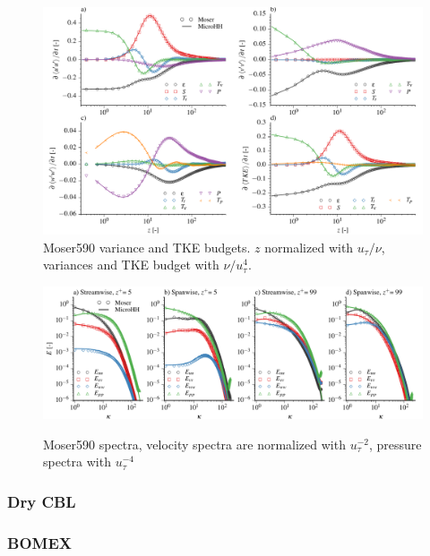 \documentclass[gmd]{copernicus}
\begin{document}
\begin{figure}[t]
\vspace*{2mm}
\begin{center}
\includegraphics[width=16.6cm]{figs/gmd_m590_turb_budg.pdf}
\end{center}
\caption{Moser590 variance and TKE budgets. $z$ normalized with $u_\tau / \nu$, variances and TKE budget with $\nu / u_\tau^{4}$.}\label{fig:moser_variance}
\end{figure}

\begin{figure}[t]
\vspace*{2mm}
\begin{center}
\includegraphics[width=16.6cm]{figs/gmd_m590_spectra_4x1.pdf}\label{fig:moser_spectra}
\end{center}
\caption{Moser590 spectra, velocity spectra are normalized with $u_\tau^{-2}$, pressure spectra with $u_\tau^{-4}$}
\end{figure}

\subsubsection{Dry CBL}

\subsubsection{BOMEX}
\end{document}
